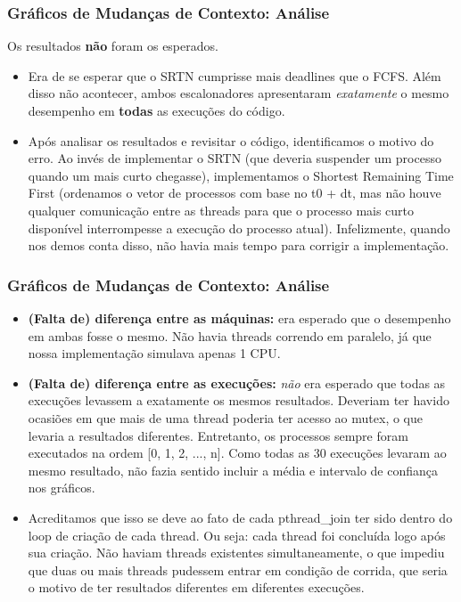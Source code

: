 \documentclass{beamer}
\begin{document}
\begin{frame}
\blindtext

\end{frame}

\begin{frame}
\frametitle{Gráficos de Mudanças de Contexto: Análise}

Os resultados \textbf{não} foram os esperados.

\begin{itemize}
\item Era de se esperar que o SRTN cumprisse mais deadlines que o FCFS. Além disso não acontecer, ambos escalonadores apresentaram \textit{exatamente} o mesmo desempenho em \textbf{todas} as execuções do código. 

\item Após analisar os resultados e revisitar o código, identificamos o motivo do erro. Ao invés de implementar o SRTN (que deveria suspender um processo quando um mais curto chegasse), implementamos o Shortest Remaining Time First (ordenamos o vetor de processos com base no t0 + dt, mas não houve qualquer comunicação entre as threads para que o processo mais curto disponível interrompesse a execução do processo atual). Infelizmente, quando nos demos conta disso, não havia mais tempo para corrigir a implementação.
\end{itemize}

\end{frame}


\begin{frame}
\frametitle{Gráficos de Mudanças de Contexto: Análise}

\begin{itemize}
\item \textbf{(Falta de) diferença entre as máquinas:} era esperado que o desempenho em ambas fosse o mesmo. Não havia threads correndo em paralelo, já que nossa implementação simulava apenas 1 CPU.

\item \textbf{(Falta de) diferença entre as execuções:} \textit{não} era esperado que todas as execuções levassem a exatamente os mesmos resultados. Deveriam ter havido ocasiões em que mais de uma thread poderia ter acesso ao mutex, o que levaria a resultados diferentes. Entretanto, os processos sempre foram executados na ordem [0, 1, 2, ..., n]. Como todas as 30 execuções levaram ao mesmo resultado, não fazia sentido incluir a média e intervalo de confiança nos gráficos.

\item Acreditamos que isso se deve ao fato de cada pthread\_join ter sido dentro do loop de criação de cada thread. Ou seja: cada thread foi concluída logo após sua criação. Não haviam threads existentes simultaneamente, o que impediu que duas ou mais threads pudessem entrar em condição de corrida, que seria o motivo de ter resultados diferentes em diferentes execuções.
\end{itemize}

\end{frame}
\end{document}
